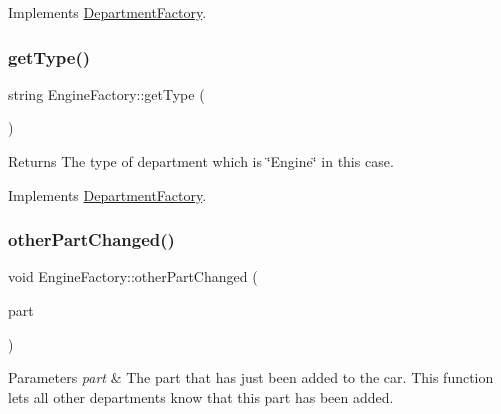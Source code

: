 Implements \hyperlink{classDepartmentFactory_a6080a560efb9fe0b9c870db5a7358886}{Department\+Factory}.

\mbox{\label{classEngineFactory_a52fd49ea32ab2dc62aa8c86e058fb138}} 
\subsubsection{\texorpdfstring{get\+Type()}{getType()}}
{\footnotesize\ttfamily string Engine\+Factory\+::get\+Type (\begin{DoxyParamCaption}{ }\end{DoxyParamCaption})\hspace{0.3cm}{\ttfamily [virtual]}}

\begin{DoxyReturn}{Returns}
The type of department which is \char`\"{}\+Engine\char`\"{} in this case. 
\end{DoxyReturn}


Implements \hyperlink{classDepartmentFactory_a5aac775b89c4c390ad885e1de8947b0d}{Department\+Factory}.

\mbox{\label{classEngineFactory_a12c1223834cb2d653a1c659aa1504c51}} 
\subsubsection{\texorpdfstring{other\+Part\+Changed()}{otherPartChanged()}}
{\footnotesize\ttfamily void Engine\+Factory\+::other\+Part\+Changed (\begin{DoxyParamCaption}\item[{\hyperlink{classDepartmentOutput}{Department\+Output} $\ast$}]{part }\end{DoxyParamCaption})\hspace{0.3cm}{\ttfamily [virtual]}}


\begin{DoxyParams}{Parameters}
{\em part} & The part that has just been added to the car. This function lets all other departments know that this part has been added. \\
\hline
\end{DoxyParams}


